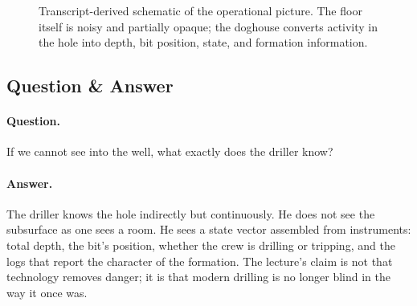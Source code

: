 \begin{figure}[h]
\centering
{}
\caption{Transcript-derived schematic of the operational picture. The floor itself is noisy and partially opaque; the doghouse converts activity in the hole into depth, bit position, state, and formation information.}
\end{figure}

\subsection{Question \& Answer}

\paragraph{Question.} If we cannot see into the well, what exactly does the driller know?

\paragraph{Answer.} The driller knows the hole indirectly but continuously. He does not see the subsurface as one sees a room. He sees a state vector assembled from instruments: total depth, the bit's position, whether the crew is drilling or tripping, and the logs that report the character of the formation. The lecture's claim is not that technology removes danger; it is that modern drilling is no longer blind in the way it once was.

